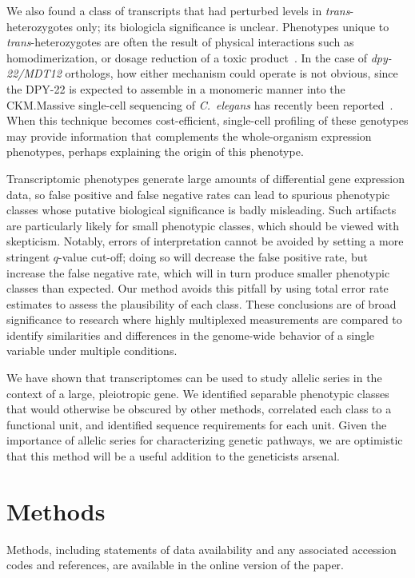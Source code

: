 \documentclass[8pt, twocolumn]{article}
\newcommand{\cel}{\emph{C.~elegans}}
\newcommand{\gene}[1]{\mbox{\emph{#1}}}
\newcommand{\protein}[1]{\mbox{\uppercase{#1}}}
\newcommand{\dpy}[1]{\gene{dpy-22#1}}
\begin{document}
We also found a class of transcripts that had perturbed levels in
\emph{trans}-heterozygotes only; its biologicla significance is unclear.
Phenotypes unique to \emph{trans}-heterozygotes are often the result of physical
interactions such as homodimerization, or dosage reduction of a toxic
product~\cite{Yook2005}. In the case of \dpy{/MDT12} orthologs, how either
mechanism could operate is not obvious, since the \protein{dpy-22} is expected
to assemble in a monomeric manner into the CKM.\@ Massive single-cell sequencing
of \cel{} has recently been reported~\cite{Cao2017}. When this technique becomes
cost-efficient, single-cell profiling of these genotypes may provide information
that complements the whole-organism expression phenotypes, perhaps explaining
the origin of this phenotype.

Transcriptomic phenotypes generate large amounts of differential gene expression
data, so false positive and false negative rates can lead to spurious phenotypic
classes whose putative biological significance is badly misleading. Such
artifacts are particularly likely for small phenotypic classes, which should be
viewed with skepticism. Notably, errors of interpretation cannot be avoided by
setting a more stringent $q$-value cut-off; doing so will decrease the
false positive rate, but increase the false negative rate, which will in turn
produce smaller phenotypic classes than expected. Our method avoids this pitfall
by using total error rate estimates to assess the plausibility
of each class. These conclusions are of broad significance to research where
highly multiplexed measurements are compared to identify similarities and
differences in the genome-wide behavior of a single variable under multiple
conditions.

We have shown that transcriptomes can be used to study allelic series in the
context of a large, pleiotropic gene. We identified separable phenotypic classes
that would otherwise be obscured by other methods, correlated
each class to a functional unit, and identified sequence requirements for each
unit. Given the importance of allelic series for characterizing genetic
pathways, we are optimistic that this method will be a useful addition to the
geneticists arsenal.


\section*{Methods}
\label{sec:methods}
Methods, including statements of data availability and any associated
accession codes and references, are available in the online version of
the paper.
\end{document}
